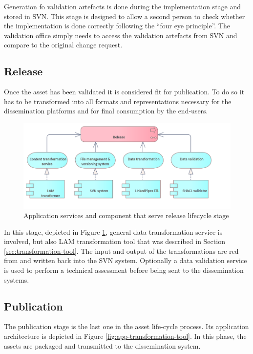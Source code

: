 	Generation fo validation artefacts is done during the implementation stage and stored in SVN. This stage is designed to allow a second person to check whether the implementation is done correctly following the ``four eye principle''. The validation office simply needs to access the validation artefacts from SVN and compare to the original change request. 
	
	\subsection{Release}
	\label{sec:release}
	
	Once the asset has been validated it is considered fit for publication. To do so it has to be transformed into all formats and representations necessary for the dissemination platforms and for final consumption by the end-users. 
	
	 \begin{figure}[!h]
		\centering
		\includegraphics[width=.8\textwidth]{images/application/lifecycle/Release.png}
		\caption{Application services and component that serve release lifecycle stage}
		\label{fig:app-release}
	\end{figure}

	In this stage, depicted in Figure \ref{fig:app-release}, general data transformation service is involved, but also LAM transformation tool that was described in Section \ref{sec:transformation-tool}. The input and output of the transformations are red from and written back into the SVN system. Optionally a data validation service is used to perform a technical assessment before being sent to the dissemination systems.
	
	\subsection{Publication}
	\label{sec:publication}
	
	The publication stage is the last one in the asset life-cycle process. Its application
architecture is depicted in Figure \ref{fig:app-transformation-tool}.
	In this phase, the assets are packaged and transmitted to the dissemination system. 
	
